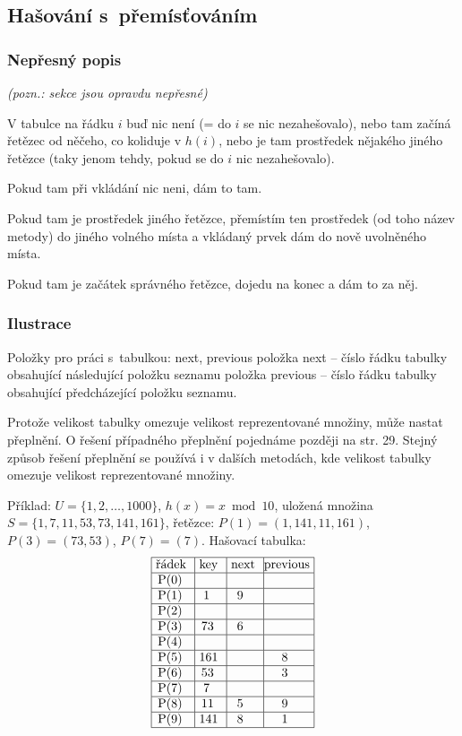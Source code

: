 \documentclass[a4paper,12pt]{article}
\begin{document}
\subsection{Hašování s~přemísťováním}

\subsubsection{Nepřesný popis}

\emph{(pozn.: sekce  jsou opravdu nepřesné)}

V tabulce na řádku $i$ buď nic není (= do $i$ se nic nezahešovalo), nebo tam začíná řetězec od něčeho, co koliduje v $h(i)$, nebo je tam prostředek nějakého jiného řetězce (taky jenom tehdy, pokud se do $i$ nic nezahešovalo).

Pokud tam při vkládání nic neni, dám to tam.

Pokud tam je prostředek jiného řetězce, přemístím ten prostředek (od toho název metody) do jiného volného místa a vkládaný prvek dám do nově uvolněného místa.

Pokud tam je začátek správného řetězce, dojedu na konec a dám to za něj.

\subsubsection{Ilustrace}


Položky pro práci s~tabulkou: next, previous\newline 
\phantom{---}položka next -- číslo řádku tabulky 
obsahující následující polož\-ku seznamu\newline 
\phantom{---}položka previous -- číslo řádku tabulky obsahující 
předcházející položku seznamu.

Pro\-to\-že ve\-li\-kost ta\-bul\-ky o\-me\-zu\-je ve\-li\-kost re\-pre\-zen\-to\-va\-né mno\-ži\-ny, mů\-že na\-stat pře\-pl\-ně\-ní. O řešení 
případného přeplnění pojednáme později na str. 29. Stejný způsob řešení přeplnění se používá i v dalších metodách, kde velikost tabulky omezuje velikost reprezentované množiny.

Příklad: $U=\{1,2,\dots,1000\}$, $h(x)=x\bmod10$,\newline 
uložená množina $S=\{1,7,11,53,73,141,161\}$,\newline 
řetězce: $P(1)=(1,141,11,161)$, 
$P(3)=(73,53)$, $P(7)=(7)$.\newline 
Hašovací tabulka:
$$\vtop{\offinterlineskip\halign {\strut\vrule\ # & \vrule\ # & \vrule\ # & \vrule \hfil # \hfil \vrule\cr\noalign{\hrule}řádek & key & next & previous\hfil \cr\noalign{\hrule}P(0) & & & \hfill \cr\noalign{\hrule}P(1) & 1 & 9 & \hfill \cr\noalign{\hrule}P(2) & & & \hfill \cr\noalign{\hrule}P(3) & 73 & 6 & \hfill \cr\noalign{\hrule}P(4) & & &\hfill \cr\noalign{\hrule}P(5) & 161 & & 8 \cr\noalign{\hrule}P(6) & 53 & & 3 \cr\noalign{\hrule}P(7) & 7 & &\hfill \cr\noalign{\hrule}P(8) & 11 & 5 & 9 \cr\noalign{\hrule}P(9) & 141 & 8 & 1 \cr\noalign{\hrule}}}$$
\end{document}
